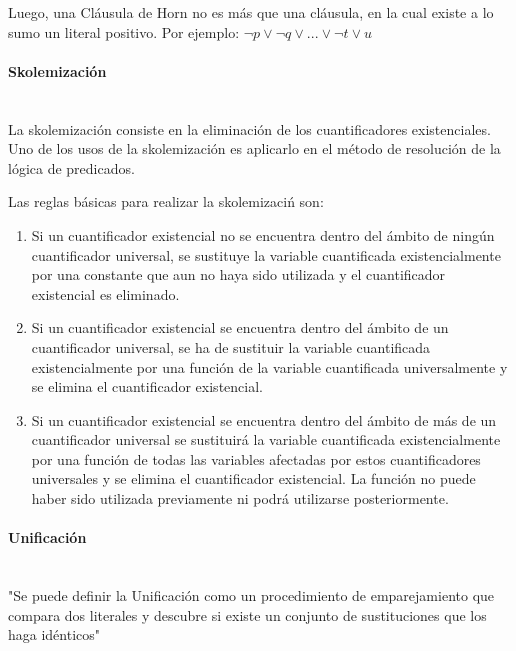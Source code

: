\documentclass{article}
\begin{document}
Luego, una Cl\'ausula de Horn no es m\'as que una cl\'ausula, en la cual existe a lo sumo un literal positivo. Por ejemplo: $ \neg p \lor \neg q \lor ... \lor \neg t \lor u$ 

\paragraph{Skolemizaci\'on}\mbox{}\\

La skolemizaci\'on consiste en la eliminaci\'on de los cuantificadores existenciales.
Uno de los usos de la skolemizaci\'on es aplicarlo en el m\'etodo de resoluci\'on de la l\'ogica de predicados.

 Las reglas básicas para realizar la skolemizaci\'n son:
\begin{enumerate}

\item Si un cuantificador existencial no se encuentra dentro del \'ambito de ning\'un cuantificador universal, se sustituye la variable cuantificada existencialmente por una constante que aun no haya sido utilizada y el cuantificador existencial es eliminado.

\item Si un cuantificador existencial se encuentra dentro del \'ambito de un cuantificador universal, se ha de sustituir la variable cuantificada existencialmente por una funci\'on de la variable cuantificada universalmente y se elimina el cuantificador existencial.
	
\item Si un cuantificador existencial se encuentra dentro del \'ambito de m\'as de un cuantificador universal se sustituir\'a la variable cuantificada existencialmente por una funci\'on de todas las variables afectadas por estos cuantificadores universales y se elimina el cuantificador existencial. La funci\'on no puede haber sido utilizada previamente ni podr\'a utilizarse posteriormente.

\end{enumerate}

\paragraph{Unificaci\'on}\mbox{}\\

"Se puede definir la Unificaci\'on como un procedimiento de emparejamiento que compara dos literales y descubre si existe un conjunto de sustituciones que los haga id\'enticos" \cite{logicaMatematica}
\end{document}
